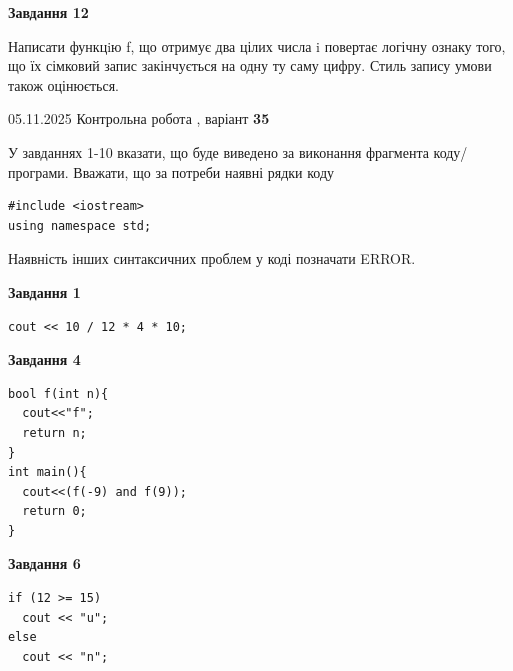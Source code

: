 \documentclass[12pt, ukrainian]{article}
\begin{document}
{\begin {large}
\begin{minipage}[t]{11.0cm}
\begin{center}
\textbf{Завдання 12}
\end{center}

Написати функцiю f, що отримує два цілих числа i повертає логічну ознаку того, що їх сімковий запис закінчується на одну ту саму цифру. Стиль запису умови також оцінюється.\par

\end{minipage}

\end {large}}
\newpage

{\Large{05.11.2025 Контрольна робота , варіант  \No \textbf { 35 }\par}}
{
\begin {large}
У завданнях 1-10 вказати, що буде виведено за виконання фрагмента коду/про\-гра\-ми.
Вважати, що за потреби наявні рядки коду
\begin{verbatim}
#include <iostream>
using namespace std;
\end{verbatim}
Наявність інших синтаксичних проблем у коді позначати ERROR.

\begin{minipage}[t]{7.0cm}

\begin{center}
\textbf{Завдання 1}
\end{center}
\vspace{-8mm}

\begin{verbatim}
cout << 10 / 12 * 4 * 10;
\end{verbatim}



\begin{center}
\textbf{Завдання 4}
\end{center}
\vspace{-8mm}

\begin{verbatim}
bool f(int n){
  cout<<"f";
  return n;
}
int main(){
  cout<<(f(-9) and f(9));
  return 0;
}
\end{verbatim}



\begin{center}
\textbf{Завдання 6}
\end{center}
\vspace{-8mm}

\begin{verbatim}
if (12 >= 15)
  cout << "u";
else
  cout << "n";
\end{verbatim}




\end{minipage}
\end{large}}
\end{document}
